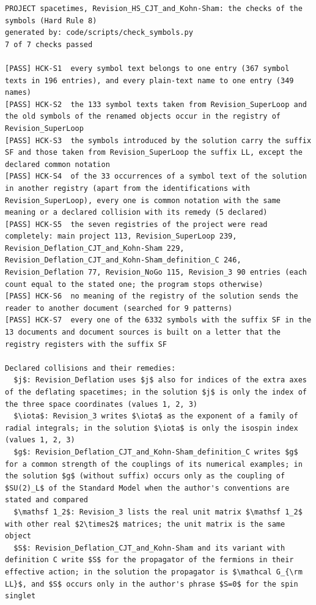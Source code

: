 \documentclass[
  10pt,
]{article}
\begin{document}
\begin{verbatim}
PROJECT spacetimes, Revision_HS_CJT_and_Kohn-Sham: the checks of the symbols (Hard Rule 8)
generated by: code/scripts/check_symbols.py
7 of 7 checks passed

[PASS] HCK-S1  every symbol text belongs to one entry (367 symbol texts in 196 entries), and every plain-text name to one entry (349 names)
[PASS] HCK-S2  the 133 symbol texts taken from Revision_SuperLoop and the old symbols of the renamed objects occur in the registry of Revision_SuperLoop
[PASS] HCK-S3  the symbols introduced by the solution carry the suffix SF and those taken from Revision_SuperLoop the suffix LL, except the declared common notation
[PASS] HCK-S4  of the 33 occurrences of a symbol text of the solution in another registry (apart from the identifications with Revision_SuperLoop), every one is common notation with the same meaning or a declared collision with its remedy (5 declared)
[PASS] HCK-S5  the seven registries of the project were read completely: main project 113, Revision_SuperLoop 239, Revision_Deflation_CJT_and_Kohn-Sham 229, Revision_Deflation_CJT_and_Kohn-Sham_definition_C 246, Revision_Deflation 77, Revision_NoGo 115, Revision_3 90 entries (each count equal to the stated one; the program stops otherwise)
[PASS] HCK-S6  no meaning of the registry of the solution sends the reader to another document (searched for 9 patterns)
[PASS] HCK-S7  every one of the 6332 symbols with the suffix SF in the 13 documents and document sources is built on a letter that the registry registers with the suffix SF

Declared collisions and their remedies:
  $j$: Revision_Deflation uses $j$ also for indices of the extra axes of the deflating spacetimes; in the solution $j$ is only the index of the three space coordinates (values 1, 2, 3)
  $\iota$: Revision_3 writes $\iota$ as the exponent of a family of radial integrals; in the solution $\iota$ is only the isospin index (values 1, 2, 3)
  $g$: Revision_Deflation_CJT_and_Kohn-Sham_definition_C writes $g$ for a common strength of the couplings of its numerical examples; in the solution $g$ (without suffix) occurs only as the coupling of $SU(2)_L$ of the Standard Model when the author's conventions are stated and compared
  $\mathsf 1_2$: Revision_3 lists the real unit matrix $\mathsf 1_2$ with other real $2\times2$ matrices; the unit matrix is the same object
  $S$: Revision_Deflation_CJT_and_Kohn-Sham and its variant with definition C write $S$ for the propagator of the fermions in their effective action; in the solution the propagator is $\mathcal G_{\rm LL}$, and $S$ occurs only in the author's phrase $S=0$ for the spin singlet
\end{verbatim}
\end{document}
